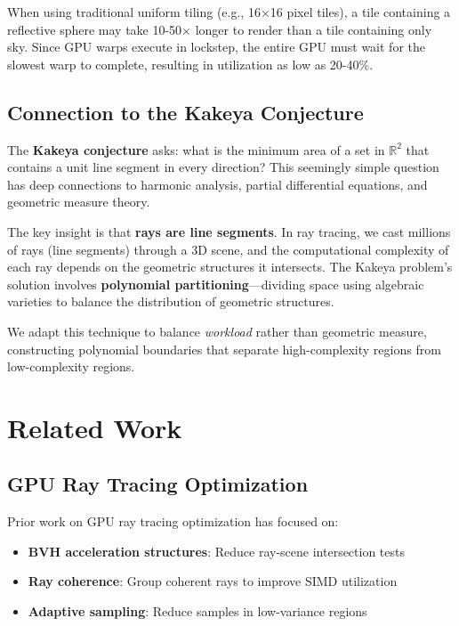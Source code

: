 \documentclass[11pt,a4paper]{article}
\begin{document}
When using traditional uniform tiling (e.g., 16×16 pixel tiles), a tile containing a reflective sphere may take 10-50× longer to render than a tile containing only sky. Since GPU warps execute in lockstep, the entire GPU must wait for the slowest warp to complete, resulting in utilization as low as 20-40\%.

\subsection{Connection to the Kakeya Conjecture}

The \textbf{Kakeya conjecture} asks: what is the minimum area of a set in $\mathbb{R}^2$ that contains a unit line segment in every direction? This seemingly simple question has deep connections to harmonic analysis, partial differential equations, and geometric measure theory.

The key insight is that \textbf{rays are line segments}. In ray tracing, we cast millions of rays (line segments) through a 3D scene, and the computational complexity of each ray depends on the geometric structures it intersects. The Kakeya problem's solution involves \textbf{polynomial partitioning}—dividing space using algebraic varieties to balance the distribution of geometric structures.

We adapt this technique to balance \textit{workload} rather than geometric measure, constructing polynomial boundaries that separate high-complexity regions from low-complexity regions.

\section{Related Work}

\subsection{GPU Ray Tracing Optimization}

Prior work on GPU ray tracing optimization has focused on:
\begin{itemize}
    \item \textbf{BVH acceleration structures}: Reduce ray-scene intersection tests~\citep{wald2007ray}
    \item \textbf{Ray coherence}: Group coherent rays to improve SIMD utilization~\citep{wald2001real}
    \item \textbf{Adaptive sampling}: Reduce samples in low-variance regions~\citep{rousselle2012adaptive}
\end{itemize}
\end{document}

